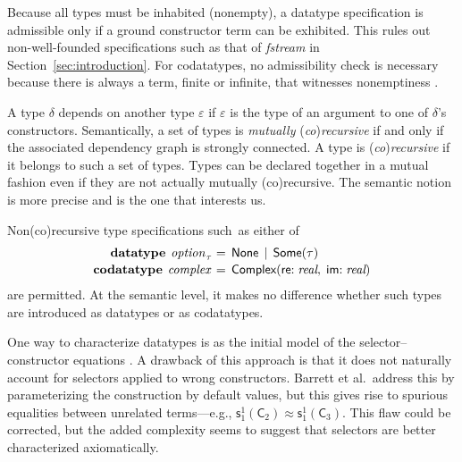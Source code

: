 \documentclass[smallcondensed,draft]{svjour3}
\newcommand\keyw[1]{\textbf{#1}}
\newcommand\const[1]{\textsf{#1}}
\newcommand\ty[1]{\textit{#1}}
\newcommand{\teq}{\approx}
\newcommand\vthinspace{\kern+0.083333em}
\begin{document}
Because all types must be inhabited (nonempty), a datatype specification is
admissible only if a ground constructor term can be exhibited.
This rules out non-well-founded specifications such as
that of \ty{fstream} in Section~\ref{sec:introduction}.
For codatatypes, no admissibility check is necessary because there is always a term,
finite or infinite, that witnesses nonemptiness \cite{blanchette-et-al-2015-esop}.

A type $\delta$ depends on another type $\varepsilon$ if $\varepsilon$ is the
type of an argument to one of $\delta$'s constructors. Semantically, a set of
types is \emph{mutually} (\emph{co})\emph{recursive} if and only if the
associated dependency graph is strongly connected.
A type is (\emph{co})\emph{recursive} if it belongs to such a set of types.
Types can be declared together in a mutual fashion even if they are not actually
mutually (co)recursive. The semantic notion is more precise and is the one that interests
us.

Non(co)recursive type specifications such~as either of
\[\begin{aligned}[t]
      \keyw{datatype}~\vthinspace\ty{option}_{\vthinspace\tau\!} & \,=\, \const{None} \,\mid\, \const{Some}(\tau) \\[-.5\jot]
      \keyw{codatatype}~\vthinspace\ty{complex} & \,=\, \const{Complex}(\const{re}{:}\; \ty{real},\; \const{im}{:}\;\ty{real})
\end{aligned}
\]
are permitted.
At the semantic level, it makes no difference whether
such types are introduced as datatypes or as codatatypes.

%
%

One way to characterize datatypes %
is as the initial model of the
selector--constructor equations \cite{barrett-et-al-2007}.
A drawback of this approach is that it does
not naturally account for selectors applied to wrong constructors. Barrett et
al.\ address this by parameterizing the construction by default values, but
this gives rise to spurious equalities between unrelated terms---e.g.,
$\const{s}_1^1(\const{C}_2) \teq \const{s}_1^1(\const{C}_3)$. This flaw
could be corrected, but the added complexity seems to suggest that selectors
are better characterized axiomatically.
\end{document}

